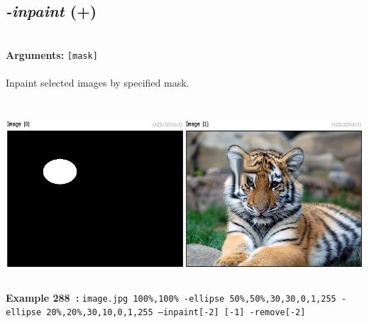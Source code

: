 \documentclass[a4paper,11pt,twoside]{book}
\begin{document}
\subsection{\emph{-inpaint} (+)}\vspace*{-0.5em}
~\\\textbf{Arguments: } 
{\small \texttt{[mask]}}\\~\\
Inpaint selected images by specified mask.
\begin{center}\includegraphics[keepaspectratio=true,height=7cm,width=\textwidth]{img/gmic_def288.jpg}\\
{\footnotesize \textbf{Example 288~:} \texttt{image.jpg 100\%,100\% -ellipse 50\%,50\%,30,30,0,1,255 -ellipse 20\%,20\%,30,10,0,1,255 --inpaint[-2] [-1] -remove[-2]}}
\end{center}
\end{document}
